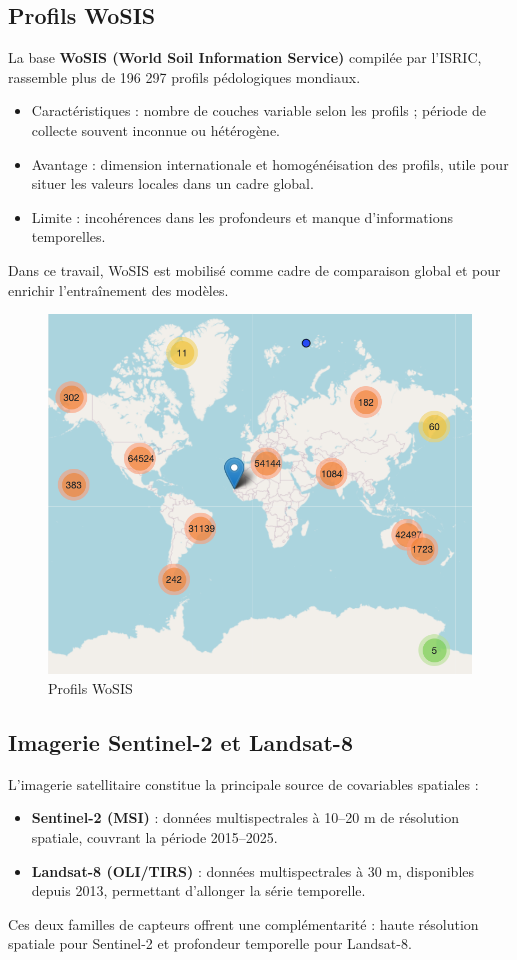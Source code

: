 \documentclass[12pt,a4paper,oneside]{report}
\begin{document}
\subsection{Profils WoSIS}
La base \textbf{WoSIS (World Soil Information Service)} \cite{wosis} compilée par l’ISRIC, rassemble plus de 196 297 profils pédologiques mondiaux.
\begin{itemize}
  \item Caractéristiques : nombre de couches variable selon les profils ; période de collecte souvent inconnue ou hétérogène.

\item Avantage : dimension internationale et homogénéisation des profils, utile pour situer les valeurs locales dans un cadre global.

\item Limite : incohérences dans les profondeurs et manque d’informations temporelles.

\end{itemize}
Dans ce travail, WoSIS est mobilisé comme cadre de comparaison global et pour enrichir l’entraînement des modèles.
\begin{figure}[h]
    \centering
    \includegraphics[width=0.5\linewidth]{images/wosis.png}
    \caption{Profils WoSIS}
    \label{fig:wosis}
\end{figure}
\subsection{Imagerie Sentinel-2 et Landsat-8}
L’imagerie satellitaire constitue la principale source de covariables spatiales :
\begin{itemize}
  \item \textbf{Sentinel-2 \cite{sentinel2} (MSI)} : données multispectrales à 10--20 m de résolution spatiale, couvrant la période 2015--2025.
  \item \textbf{Landsat-8 \cite{landsat8} (OLI/TIRS)} : données multispectrales à 30 m, disponibles depuis 2013, permettant d’allonger la série temporelle.
\end{itemize}
Ces deux familles de capteurs offrent une complémentarité : haute résolution spatiale pour Sentinel-2 et profondeur temporelle pour Landsat-8.
\end{document}
